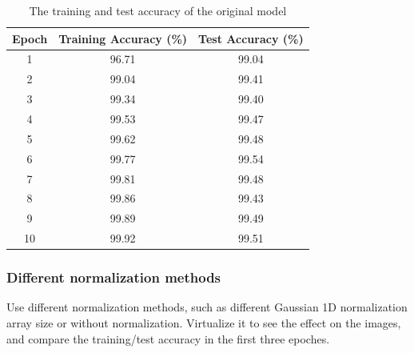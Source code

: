 \documentclass[final]{siamltexmm}
\begin{document}
{\begin{table}[H]
\begin{center}
    \begin{tabular}{| c | c | c |}
    \hline
    Epoch & Training Accuracy (\%) & Test Accuracy (\%) \\ \hline
    1 & 96.71 & 99.04 \\ \hline
    2 & 99.04 & 99.41 \\ \hline
    3 & 99.34 & 99.40 \\ \hline
    4 & 99.53 & 99.47 \\ \hline
    5 & 99.62 & 99.48 \\ \hline
    6 & 99.77 & 99.54 \\ \hline
    7 & 99.81 & 99.48 \\ \hline
    8 & 99.86 & 99.43 \\ \hline  
    9 & 99.89 & 99.49 \\ \hline
    10 & 99.92 & 99.51 \\ \hline      
    \end{tabular}
\end{center}
\caption{The training and test accuracy of the original model}
\end{table}


\subsubsection{Different normalization methods}
Use different normalization methods, such as different Gaussian 1D normalization array size or without normalization. Virtualize it to see the effect on the images, and compare the training/test accuracy in the first three epoches.

}
\end{document}
